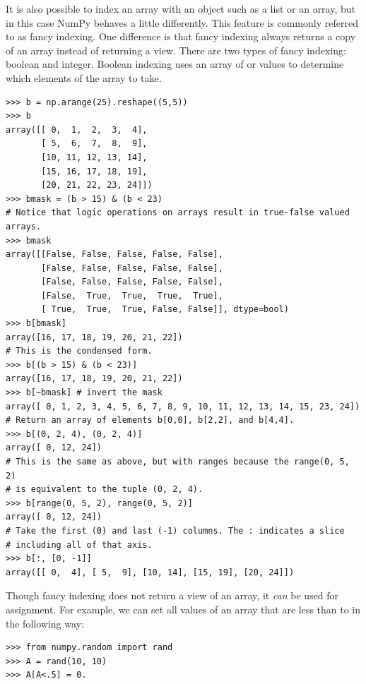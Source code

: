 It is also possible to index an array with an object such as a list or
an array, but in this case NumPy behaves a little differently. This
feature is commonly referred to as fancy indexing. One difference is
that fancy indexing always returns a copy of an array instead of returning 
a view. 
There are two types of fancy indexing: boolean and integer. 
Boolean indexing uses an array of  or  values to 
determine which elements of the array to take. 
\begin{lstlisting}
>>> b = np.arange(25).reshape((5,5)) 
>>> b
array([[ 0,  1,  2,  3,  4],
       [ 5,  6,  7,  8,  9],
       [10, 11, 12, 13, 14],
       [15, 16, 17, 18, 19],
       [20, 21, 22, 23, 24]])
>>> bmask = (b > 15) & (b < 23) 
# Notice that logic operations on arrays result in true-false valued arrays.
>>> bmask 
array([[False, False, False, False, False],
       [False, False, False, False, False],
       [False, False, False, False, False],
       [False,  True,  True,  True,  True],
       [ True,  True,  True, False, False]], dtype=bool)
>>> b[bmask]
array([16, 17, 18, 19, 20, 21, 22])
# This is the condensed form. 
>>> b[(b > 15) & (b < 23)] 
array([16, 17, 18, 19, 20, 21, 22])
>>> b[~bmask] # invert the mask
array([ 0, 1, 2, 3, 4, 5, 6, 7, 8, 9, 10, 11, 12, 13, 14, 15, 23, 24])
# Return an array of elements b[0,0], b[2,2], and b[4,4].
>>> b[(0, 2, 4), (0, 2, 4)] 
array([ 0, 12, 24])
# This is the same as above, but with ranges because the range(0, 5, 2)
# is equivalent to the tuple (0, 2, 4).
>>> b[range(0, 5, 2), range(0, 5, 2)] 
array([ 0, 12, 24])
# Take the first (0) and last (-1) columns. The : indicates a slice 
# including all of that axis.
>>> b[:, [0, -1]]  
array([[ 0,  4], [ 5,  9], [10, 14], [15, 19], [20, 24]])
\end{lstlisting}

Though fancy indexing does not return a view of an array, it \emph{can}
be used for assignment. For example, we can set all values of an array
that are less than  to  in the following way: 
\begin{lstlisting}
>>> from numpy.random import rand 
>>> A = rand(10, 10) 
>>> A[A<.5] = 0.
\end{lstlisting}

